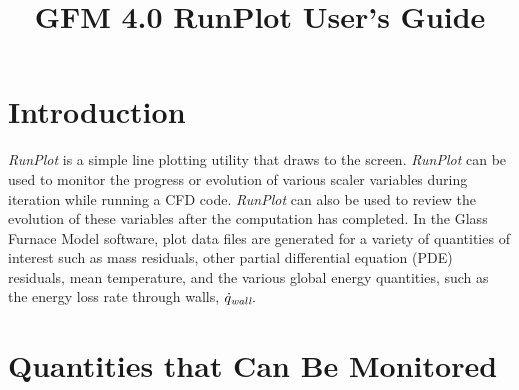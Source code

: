 \documentclass[12pt,twoside]{article}
\title{\bf GFM 4.0 RunPlot User's Guide}
\date{}
\newcommand{\var}[1]{\text{\it #1}}
\newcommand{\prog}[1]{\textsl{#1}}
\numberwithin{equation}{section}
\begin{document}
\maketitle
\section*{Introduction}
\prog{RunPlot} is a simple line plotting utility that draws to the screen. 
\prog{RunPlot} can be used to monitor the progress or evolution of various scaler variables during iteration while running a CFD code. \prog{RunPlot} can also be used to review the evolution of these variables after the computation has completed. In the Glass Furnace Model software, plot data files are generated for a variety of quantities of interest such as mass residuals, other partial differential equation (PDE) residuals, mean temperature, and the various global energy quantities, such as the energy loss rate through walls, $\dot q_\var{wall}.$

\section*{Quantities that Can Be Monitored}
\end{document}
